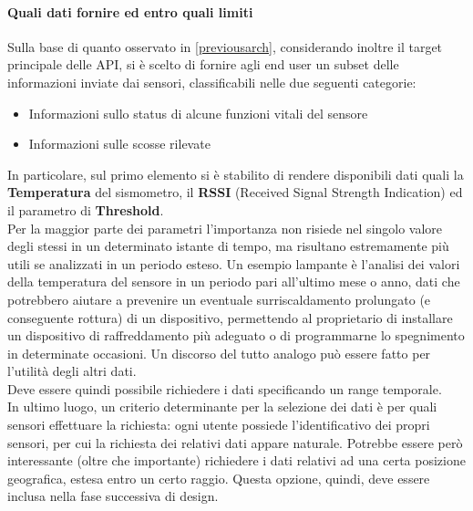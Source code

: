 \paragraph{Quali dati fornire ed entro quali limiti} 
Sulla base di quanto osservato in \ref{previousarch}, considerando inoltre il target principale delle API, si è scelto di fornire agli end user un subset delle informazioni inviate dai sensori, classificabili nelle due seguenti categorie:
\begin{itemize}
    \item Informazioni sullo status di alcune funzioni vitali del sensore
    \item Informazioni sulle scosse rilevate
\end{itemize}
In particolare, sul primo elemento si è stabilito di rendere disponibili dati quali la \textbf{Temperatura} del sismometro, il \textbf{RSSI} (Received Signal Strength Indication) ed il parametro di \textbf{Threshold}. \\
Per la maggior parte dei parametri l'importanza non risiede nel singolo valore degli stessi in un determinato istante di tempo, ma risultano estremamente più utili se analizzati in un periodo esteso. Un esempio lampante è l'analisi dei valori della temperatura del sensore in un periodo pari all'ultimo mese o anno, dati che potrebbero aiutare a prevenire un eventuale surriscaldamento prolungato (e conseguente rottura) di un dispositivo, permettendo al proprietario di installare un dispositivo di raffreddamento più adeguato o di programmarne lo spegnimento in determinate occasioni. Un discorso del tutto analogo può essere fatto per l'utilità degli altri dati.\\
Deve essere quindi possibile richiedere i dati specificando un range temporale.\\
In ultimo luogo, un criterio determinante per la selezione dei dati è per quali sensori effettuare la richiesta: ogni utente possiede l'identificativo dei propri sensori, per cui la richiesta dei relativi dati appare naturale.
Potrebbe essere però interessante (oltre che importante) richiedere i dati relativi ad una certa posizione geografica, estesa entro un certo raggio. Questa opzione, quindi, deve essere inclusa nella fase successiva di design.

